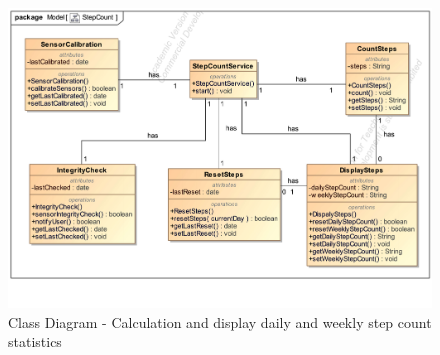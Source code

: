 \documentclass{article}
\begin{document}
		\clearpage
		\begin{figure}[h!]
			\centering
			\captionsetup{labelformat=empty}
			\caption{Class Diagram - Calculation and display daily and weekly step count statistics}
		    	\includegraphics[width=\textwidth, angle=0]{Marc/step/StepCountClass.pdf}
		\end{figure}
		\clearpage
\end{document}
